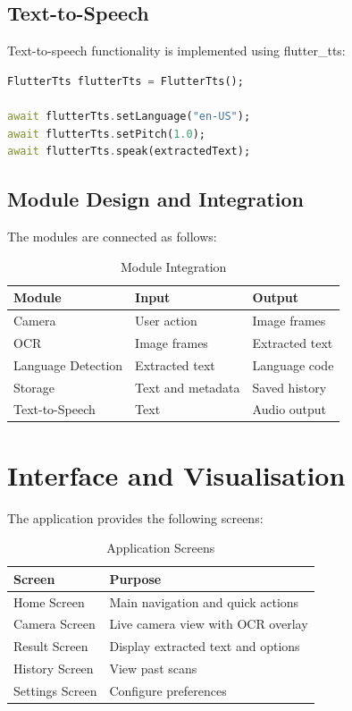 \documentclass[12pt,a4paper]{report}
\begin{document}
\subsection{Text-to-Speech}

Text-to-speech functionality is implemented using flutter\_tts:

\begin{lstlisting}[language=Dart]
FlutterTts flutterTts = FlutterTts();

await flutterTts.setLanguage("en-US");
await flutterTts.setPitch(1.0);
await flutterTts.speak(extractedText);
\end{lstlisting}

\subsection{Module Design and Integration}

The modules are connected as follows:

\begin{table}[H]
\centering
\caption{Module Integration}
\begin{tabular}{|p{4cm}|p{4cm}|p{4cm}|}
\hline
\textbf{Module} & \textbf{Input} & \textbf{Output} \\ \hline
Camera & User action & Image frames \\ \hline
OCR & Image frames & Extracted text \\ \hline
Language Detection & Extracted text & Language code \\ \hline
Storage & Text and metadata & Saved history \\ \hline
Text-to-Speech & Text & Audio output \\ \hline
\end{tabular}
\end{table}

\section{Interface and Visualisation}

The application provides the following screens:

\begin{table}[H]
\centering
\caption{Application Screens}
\begin{tabular}{|p{4cm}|p{6cm}|}
\hline
\textbf{Screen} & \textbf{Purpose} \\ \hline
Home Screen & Main navigation and quick actions \\ \hline
Camera Screen & Live camera view with OCR overlay \\ \hline
Result Screen & Display extracted text and options \\ \hline
History Screen & View past scans \\ \hline
Settings Screen & Configure preferences \\ \hline
\end{tabular}
\end{table}
\end{document}
